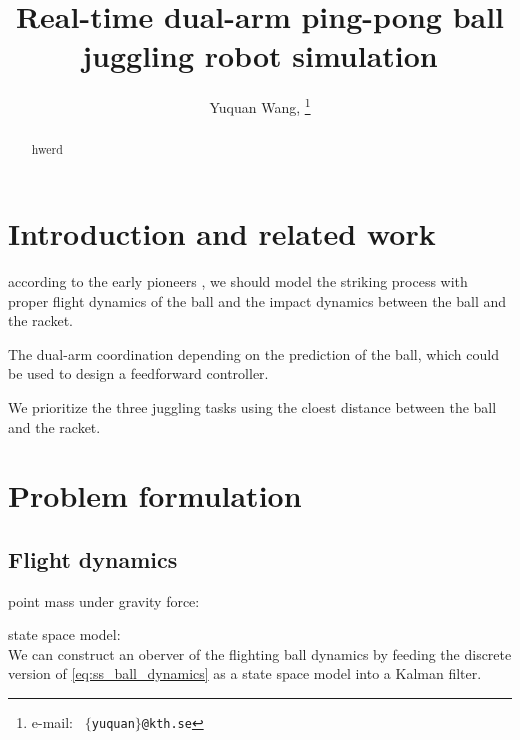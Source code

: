 \documentclass[letterpaper, 10 pt, conference]{ieeeconf}  %
\begin{document}
\title{\LARGE \bf
Real-time dual-arm ping-pong ball juggling robot simulation
}
\author{
  Yuquan Wang, 
  \thanks{
    e-mail: \tt{ $\{$yuquan$\}$@kth.se}}
}

\maketitle
\thispagestyle{empty}
\pagestyle{empty}

\begin{abstract}
hwerd 
\end{abstract}

\IEEEpeerreviewmaketitle

\section{Introduction and related work}
\label{sec:intro}


according to the early pioneers \cite{rizzi1992distributed}, we should model the
striking process with proper flight dynamics of the ball and the impact dynamics
between the ball and the racket. 

The dual-arm coordination depending on the prediction of the ball, which could be used to design a feedforward controller. 
   
We prioritize the three juggling tasks using the cloest distance between the ball and the racket. 

\section{Problem formulation}

\subsection{Flight dynamics }
point mass under gravity force:

state space model: 
\begin{equation}
\label{eq:ss_ball_dynamics}
\end{equation}
We can construct an oberver of the flighting ball dynamics by feeding the discrete version of \eqref{eq:ss_ball_dynamics} as a state space model into a Kalman filter.  
\end{document}

